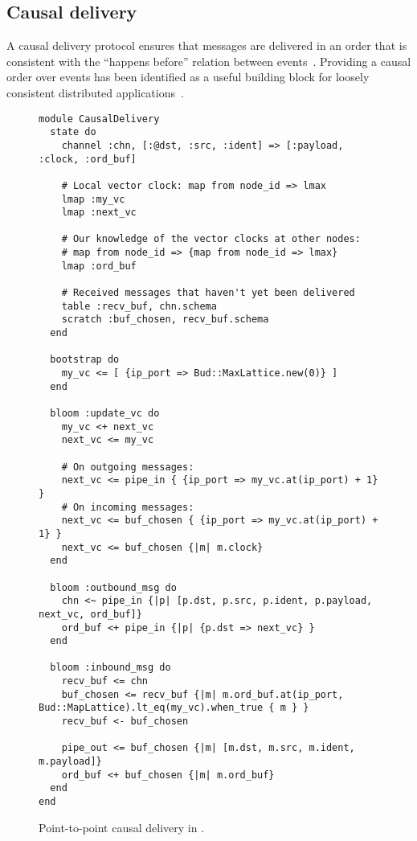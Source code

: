 \subsection{Causal delivery}
A causal delivery protocol ensures that messages are delivered in an order that
is consistent with the ``happens before'' relation between
events~\cite{Lamport1978}. Providing a causal order over events has been
identified as a useful building block for loosely consistent distributed
applications~\cite{Lloyd2011}.

\begin{figure}[t]
\begin{scriptsize}
\begin{lstlisting}
module CausalDelivery
  state do
    channel :chn, [:@dst, :src, :ident] => [:payload, :clock, :ord_buf]

    # Local vector clock: map from node_id => lmax
    lmap :my_vc
    lmap :next_vc

    # Our knowledge of the vector clocks at other nodes:
    # map from node_id => {map from node_id => lmax}
    lmap :ord_buf

    # Received messages that haven't yet been delivered
    table :recv_buf, chn.schema
    scratch :buf_chosen, recv_buf.schema
  end

  bootstrap do
    my_vc <= [ {ip_port => Bud::MaxLattice.new(0)} ]
  end

  bloom :update_vc do
    my_vc <+ next_vc
    next_vc <= my_vc

    # On outgoing messages:
    next_vc <= pipe_in { {ip_port => my_vc.at(ip_port) + 1} }
    # On incoming messages:
    next_vc <= buf_chosen { {ip_port => my_vc.at(ip_port) + 1} }
    next_vc <= buf_chosen {|m| m.clock}
  end

  bloom :outbound_msg do
    chn <~ pipe_in {|p| [p.dst, p.src, p.ident, p.payload, next_vc, ord_buf]}
    ord_buf <+ pipe_in {|p| {p.dst => next_vc} }
  end

  bloom :inbound_msg do
    recv_buf <= chn
    buf_chosen <= recv_buf {|m| m.ord_buf.at(ip_port, Bud::MapLattice).lt_eq(my_vc).when_true { m } }
    recv_buf <- buf_chosen

    pipe_out <= buf_chosen {|m| [m.dst, m.src, m.ident, m.payload]}
    ord_buf <+ buf_chosen {|m| m.ord_buf}
  end
end
\end{lstlisting}
\end{scriptsize}
\caption{Point-to-point causal delivery in \lang.}
\label{fig:causal-delivery-src}
\end{figure}
